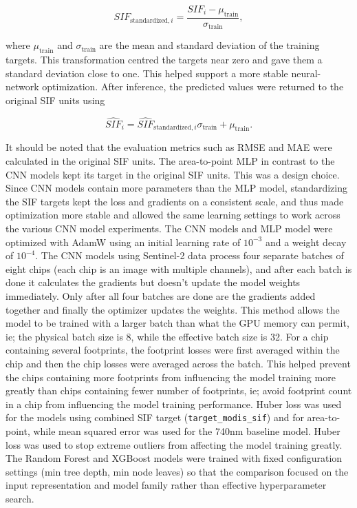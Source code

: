 \begin{equation}
SIF_{\mathrm{standardized},i}
=
\frac{SIF_i-\mu_{\mathrm{train}}}
{\sigma_{\mathrm{train}}},
\end{equation}

where $\mu_{\mathrm{train}}$ and $\sigma_{\mathrm{train}}$ are the mean and standard deviation of the training targets. This transformation centred the targets near zero and gave them a standard deviation close to one. This helped support a more stable neural-network optimization. After inference, the predicted values were returned to the original SIF units using

\begin{equation}
\widehat{SIF}_i
=
\widehat{SIF}_{\mathrm{standardized},i}
\sigma_{\mathrm{train}}
+
\mu_{\mathrm{train}}.
\end{equation}

It should be noted that the evaluation metrics such as RMSE and MAE were calculated in the original SIF units. The area-to-point MLP in contrast to the CNN models kept its target in the original SIF units. This was a design choice. Since CNN models contain more parameters than the MLP model, standardizing the SIF targets kept the loss and gradients on a consistent scale, and thus made optimization more stable and allowed the same learning settings to work across the various CNN model experiments. The CNN models and MLP model were optimized with AdamW using an initial learning rate of $10^{-3}$ and a weight decay of $10^{-4}$. The CNN models using Sentinel-2 data process four separate batches of eight chips (each chip is an image with multiple channels), and after each batch is done it calculates the gradients but doesn't update the model weights immediately. Only after all four batches are done are the gradients added together and finally the optimizer updates the weights. This method allows the model to be trained with a larger batch than what the GPU memory can permit, ie; the physical batch size is 8, while the effective batch size is 32. For a chip containing several footprints, the footprint losses were first averaged within the chip and then the chip losses were averaged across the batch. This helped prevent the chips containing more footprints from influencing the model training more greatly than chips containing fewer number of footprints, ie; avoid footprint count in a chip from influencing the model training performance. Huber loss was used for the models using combined SIF target (\texttt{target\_modis\_sif}) and for area-to-point, while mean squared error was used for the 740nm baseline model. Huber loss was used to stop extreme outliers from affecting the model training greatly. The Random Forest and XGBoost models were trained with fixed configuration settings (min tree depth, min node leaves) so that the comparison focused on the input representation and model family rather than effective hyperparameter search.

